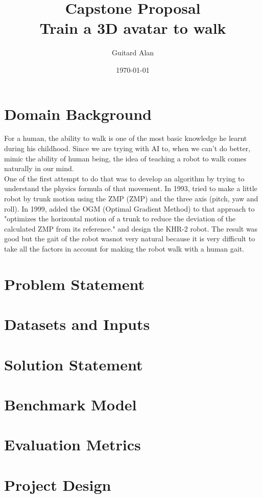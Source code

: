 \documentclass{article}
\title{\textbf{Capstone Proposal}\\Train a 3D avatar to walk}
\date{\today}
\author{Guitard Alan}
\begin{document}
	\maketitle	
	\section{Domain Background}

  For a human, the ability to walk is one of the most basic knowledge he learnt
  during his childhood. Since we are trying with AI to, when we can't do better,
  mimic the ability of human being, the idea of teaching a robot to walk comes
  naturally in our mind.\\
  One of the first attempt to do that was to develop an algorithm by trying to
  understand the physics formula of that movement. In 1993,
  \citet{1993-TrunkMotion} tried to make a little robot by trunk motion
  using the ZMP (\gls{ZMP}) and the three
  axis (pitch, yaw and roll)\cite{1993-TrunkMotion}. In 1999, \citeauthor{1999-KHR-2}
  added the OGM (Optimal Gradient Method) to that approach
  to "optimizes the horizontal motion of a trunk to reduce the
  deviation of the calculated ZMP from its
  reference." \cite{1999-KHR-2} and design the KHR-2 robot.
  The result was good but the gait of the robot wasnot very natural because
  it is very difficult to take all the factors in account for making
  the robot walk with a human gait.\\
  \cite{2013-TOG-MuscleBasedBipeds}
  
  
	\section{Problem Statement}
	
	\section{Datasets and Inputs}
	
	\section{Solution Statement}
	
	\section{Benchmark Model}
	
	\section{Evaluation Metrics}
	
	\section{Project Design}

  \clearpage
  
  
  
  \printglossary
\end{document}
